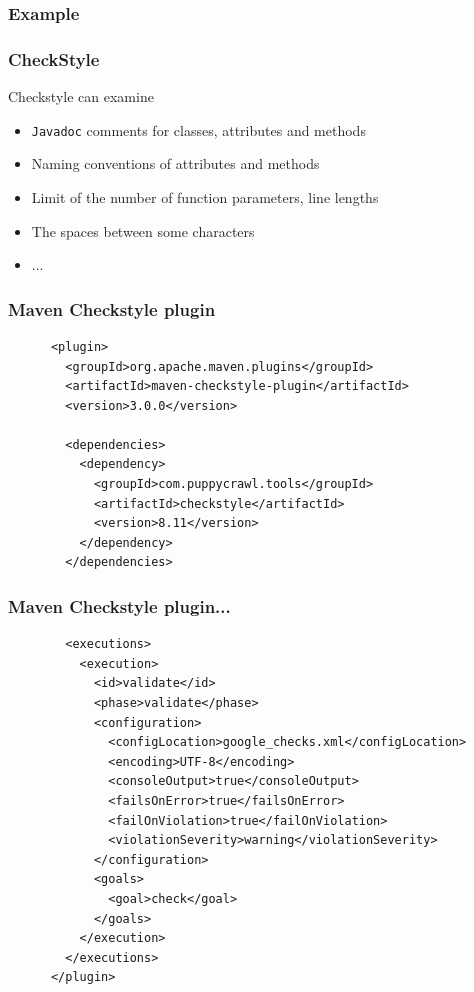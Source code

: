 \documentclass{beamer}
\begin{document}
\begin{frame}[fragile]
\frametitle{Example}


\end{frame}


\begin{frame}[fragile]
\frametitle{CheckStyle}

Checkstyle can examine
\begin{itemize}
\item \texttt{Javadoc} comments for classes, attributes and methods
\item Naming conventions of attributes and methods
\item Limit of the number of function parameters, line lengths
\item The spaces between some characters
\item ...
\end{itemize}

\end{frame}


\begin{frame}[fragile]
\frametitle{Maven Checkstyle plugin}
\begin{lstlisting}
      <plugin>
        <groupId>org.apache.maven.plugins</groupId>
        <artifactId>maven-checkstyle-plugin</artifactId>
        <version>3.0.0</version>

        <dependencies>
          <dependency>
            <groupId>com.puppycrawl.tools</groupId>
            <artifactId>checkstyle</artifactId>
            <version>8.11</version>
          </dependency>
        </dependencies>

\end{lstlisting}

\end{frame}

\begin{frame}[fragile]
\frametitle{Maven Checkstyle plugin...}
\begin{lstlisting}
        <executions>
          <execution>
            <id>validate</id>
            <phase>validate</phase>
            <configuration>
              <configLocation>google_checks.xml</configLocation>
              <encoding>UTF-8</encoding>
              <consoleOutput>true</consoleOutput>
              <failsOnError>true</failsOnError>
              <failOnViolation>true</failOnViolation>
              <violationSeverity>warning</violationSeverity>
            </configuration>
            <goals>
              <goal>check</goal>
            </goals>
          </execution>
        </executions>
      </plugin>
\end{lstlisting}
\end{frame}
\end{document}
